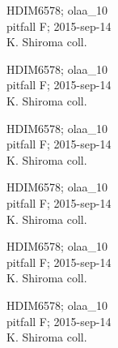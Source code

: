 \documentclass[2pt]{extarticle}
\begin{document}
\noindent
\parbox{0.16\textwidth}{\tiny \raggedright \rule[-0.3\baselineskip]{0pt}{10pt}HDIM6578; olaa\_10\\ pitfall F; 2015-sep-14\\ K. Shiroma coll.}
\parbox{0.16\textwidth}{\tiny \raggedright \rule[-0.3\baselineskip]{0pt}{10pt}HDIM6578; olaa\_10\\ pitfall F; 2015-sep-14\\ K. Shiroma coll.}
\parbox{0.16\textwidth}{\tiny \raggedright \rule[-0.3\baselineskip]{0pt}{10pt}HDIM6578; olaa\_10\\ pitfall F; 2015-sep-14\\ K. Shiroma coll.}
\parbox{0.16\textwidth}{\tiny \raggedright \rule[-0.3\baselineskip]{0pt}{10pt}HDIM6578; olaa\_10\\ pitfall F; 2015-sep-14\\ K. Shiroma coll.}
\parbox{0.16\textwidth}{\tiny \raggedright \rule[-0.3\baselineskip]{0pt}{10pt}HDIM6578; olaa\_10\\ pitfall F; 2015-sep-14\\ K. Shiroma coll.}
\parbox{0.16\textwidth}{\tiny \raggedright \rule[-0.3\baselineskip]{0pt}{10pt}HDIM6578; olaa\_10\\ pitfall F; 2015-sep-14\\ K. Shiroma coll.}
\end{document}
